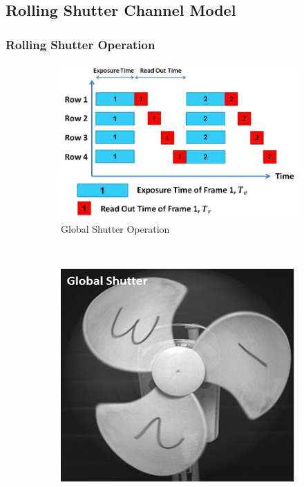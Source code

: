 \subsection{Rolling Shutter Channel Model}
\subsubsection{Rolling Shutter Operation}

\begin{figure}[!t] %
	\centering
	\begin{subfigure}[h]{0.3\textwidth}
		\includegraphics[width=\textwidth]{fig/global_shutter.png}
		\caption{Global Shutter Operation}
	\end{subfigure}
	~
	\begin{subfigure}[h]{0.15\textwidth}
		\includegraphics[width=\textwidth]{fig/fan_global}

\end{subfigure}
\end{figure}
